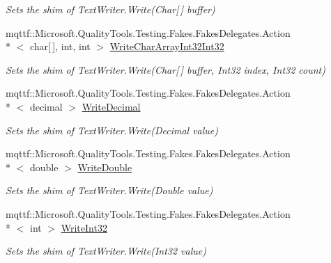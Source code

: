 \begin{DoxyCompactItemize}
\begin{DoxyCompactList}\small\item\em Sets the shim of Text\-Writer.\-Write(\-Char\mbox{[}$\,$\mbox{]} buffer)\end{DoxyCompactList}\item 
mqttf\-::\-Microsoft.\-Quality\-Tools.\-Testing.\-Fakes.\-Fakes\-Delegates.\-Action\\*
$<$ char\mbox{[}$\,$\mbox{]}, int, int $>$ \hyperlink{class_system_1_1_i_o_1_1_fakes_1_1_shim_text_writer_a7270f99bbf90fc744ed5f3eefb151cf2}{Write\-Char\-Array\-Int32\-Int32}
\begin{DoxyCompactList}\small\item\em Sets the shim of Text\-Writer.\-Write(\-Char\mbox{[}$\,$\mbox{]} buffer, Int32 index, Int32 count)\end{DoxyCompactList}\item 
mqttf\-::\-Microsoft.\-Quality\-Tools.\-Testing.\-Fakes.\-Fakes\-Delegates.\-Action\\*
$<$ decimal $>$ \hyperlink{class_system_1_1_i_o_1_1_fakes_1_1_shim_text_writer_a7c8ab5a44f689800a60bcc4f6cea8ff7}{Write\-Decimal}
\begin{DoxyCompactList}\small\item\em Sets the shim of Text\-Writer.\-Write(\-Decimal value)\end{DoxyCompactList}\item 
mqttf\-::\-Microsoft.\-Quality\-Tools.\-Testing.\-Fakes.\-Fakes\-Delegates.\-Action\\*
$<$ double $>$ \hyperlink{class_system_1_1_i_o_1_1_fakes_1_1_shim_text_writer_a0b5e18ceea968a908587767fb92c96f6}{Write\-Double}
\begin{DoxyCompactList}\small\item\em Sets the shim of Text\-Writer.\-Write(\-Double value)\end{DoxyCompactList}\item 
mqttf\-::\-Microsoft.\-Quality\-Tools.\-Testing.\-Fakes.\-Fakes\-Delegates.\-Action\\*
$<$ int $>$ \hyperlink{class_system_1_1_i_o_1_1_fakes_1_1_shim_text_writer_a6dc8662260ee802ca5451398e7fd2e5a}{Write\-Int32}
\begin{DoxyCompactList}\small\item\em Sets the shim of Text\-Writer.\-Write(\-Int32 value)\end{DoxyCompactList}\item 

\end{DoxyCompactItemize}
